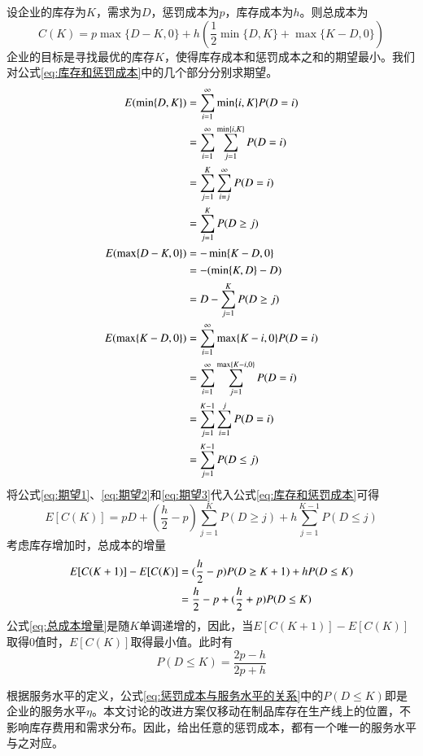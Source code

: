 设企业的库存为$K$，需求为$D$，惩罚成本为$p$，库存成本为$h$。则总成本为
\begin{equation}
C(K) = p\max\{D-K,0\} + h(\frac{1}{2}\min\{D,K\}+\max\{K-D,0\})
\label{eq:库存和惩罚成本}
\end{equation}
企业的目标是寻找最优的库存$K$，使得库存成本和惩罚成本之和的期望最小。我们对公式\ref{eq:库存和惩罚成本}中的几个部分分别求期望。
\begin{align}
E(\min\{D,K\}) &= \sum_{i=1}^{\infty}\min\{i,K\}P(D=i) \notag\\
&= \sum_{i=1}^{\infty}\sum_{j=1}^{\min\{i,K\}}P(D=i) \notag\\
&= \sum_{j=1}^K\sum_{i=j}^{\infty}P(D=i) \notag\\
&= \sum_{j=1}^K P(D \geq j) \label{eq:期望1}\\
E(\max\{D-K,0\}) &= -\min\{K-D,0\} \notag\\
&= -(\min\{K,D\}-D) \notag\\
&= D - \sum_{j=1}^K P(D \geq j) \label{eq:期望2}\\
E(\max\{K-D,0\}) &= \sum_{i=1}^{\infty}\max\{K-i,0\}P(D=i) \notag\\
&= \sum_{i=1}^{\infty}\sum_{j=1}^{\max\{K-i,0\}}P(D=i) \notag\\
&= \sum_{j=1}^{K-1}\sum_{i=1}^j P(D=i) \notag\\
&= \sum_{j=1}^{K-1}P(D \leq j) \label{eq:期望3}
\end{align}
将公式\ref{eq:期望1}、\ref{eq:期望2}和\ref{eq:期望3}代入公式\ref{eq:库存和惩罚成本}可得
\begin{equation}
E[C(K)] = pD + (\frac{h}{2}-p)\sum_{j=1}^K P(D \geq j) + h\sum_{j=1}^{K-1} P(D \leq j)
\label{eq:库存和惩罚成本期望}
\end{equation}
考虑库存增加时，总成本的增量
\begin{align}
E[C(K+1)]-E[C(K)] &= (\frac{h}{2}-p)P(D\geq K+1) + hP(D\leq K) \notag\\
&= \frac{h}{2}-p+(\frac{h}{2}+p)P(D\leq K) \label{eq:总成本增量}
\end{align}
公式\ref{eq:总成本增量}是随$K$单调递增的，因此，当$E[C(K+1)]-E[C(K)]$取得0值时，$E[C(K)]$取得最小值。此时有
\begin{equation}
P(D\leq K) = \frac{2p-h}{2p+h}
\label{eq:惩罚成本与服务水平的关系}
\end{equation}

根据服务水平的定义，公式\ref{eq:惩罚成本与服务水平的关系}中的$P(D\leq K)$即是企业的服务水平$\eta$。本文讨论的改进方案仅移动在制品库存在生产线上的位置，不影响库存费用和需求分布。因此，给出任意的惩罚成本，都有一个唯一的服务水平与之对应。

